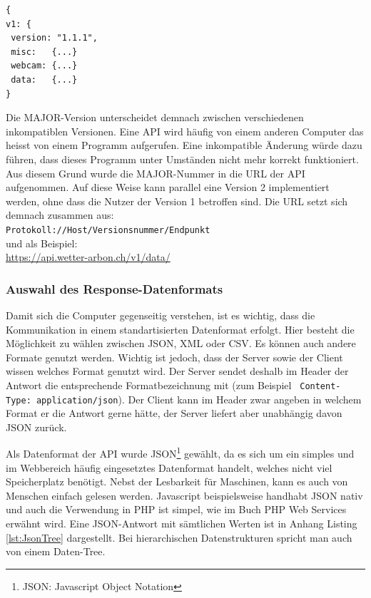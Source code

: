 \vspace{3mm}
\begin{lstlisting}[label=lst:versionierung,caption=Versionierungsangabe auf der obersten Hierarchiestufe, language=HTML5, style=php]
{
v1: {
 version: "1.1.1",
 misc:   {...}
 webcam: {...}
 data:   {...}
}
\end{lstlisting}
\vspace{3mm}

\noindent
Die MAJOR-Version unterscheidet demnach zwischen verschiedenen inkompatiblen Versionen. Eine API wird häufig von einem anderen Computer das heisst von einem Programm aufgerufen. Eine inkompatible Änderung würde dazu führen, dass dieses Programm unter Umständen nicht mehr korrekt funktioniert. Aus diesem Grund wurde die MAJOR-Nummer in die URL der API aufgenommen. Auf diese Weise kann parallel eine Version 2 implementiert werden, ohne dass die Nutzer der Version 1 betroffen sind. Die URL setzt sich demnach zusammen aus: \\

\noindent
\texttt{Protokoll://Host/Versionsnummer/Endpunkt}\\
und als Beispiel:\\
\url{https://api.wetter-arbon.ch/v1/data/}

\noindent
{}


\subsubsection{Auswahl des Response-Datenformats}
Damit sich die Computer gegenseitig verstehen, ist es wichtig, dass die Kommunikation in einem standartisierten Datenformat erfolgt. Hier besteht die Möglichkeit zu wählen zwischen JSON, XML oder CSV. Es können auch andere Formate genutzt werden. Wichtig ist jedoch, dass der Server sowie der Client wissen welches Format genutzt wird. Der Server sendet deshalb im Header der Antwort die entsprechende Formatbezeichnung mit (zum Beispiel \texttt{ Content-Type: application/json}). Der Client kann im Header zwar angeben in welchem Format er die Antwort gerne hätte, der Server liefert aber unabhängig davon JSON zurück.

Als Datenformat der API wurde JSON\footnote{JSON: Javascript Object Notation} gewählt, da es sich um ein simples und im Webbereich häufig eingesetztes Datenformat handelt, welches nicht viel Speicherplatz benötigt. Nebst der Lesbarkeit für Maschinen, kann es auch von Menschen einfach gelesen werden. Javascript beispielsweise handhabt JSON nativ und auch die Verwendung in PHP ist simpel, wie im Buch PHP Web Services \cite{LornaJaneMitchell2013oreilly} erwähnt wird. Eine JSON-Antwort mit sämtlichen Werten ist in Anhang Listing \ref{lst:JsonTree} dargestellt. Bei hierarchischen Datenstrukturen spricht man auch von einem Daten-Tree.

